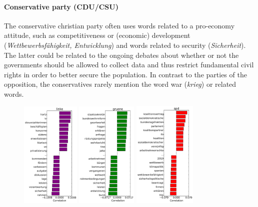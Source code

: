 \documentclass[runningheads,a4paper]{llncs}
\begin{document}
\paragraph{\bf Conservative party (CDU/CSU)}
The conservative christian party often uses words related to a pro-economy attitude, such as competitiveness or (economic) development ({\em Wettbewerbsf\"ahigkeit, Entwicklung}) and words related to security ({\em Sicherheit}). The latter could be related to the ongoing debates about whether or not the governments should be allowed to collect data and thus restrict fundamental civil rights in order to better secure the population. In contrast to the parties of the opposition, the conservatives rarely mention the word war ({\em krieg}) or related words.


\begin{figure}
\begin{center}
\includegraphics[width=2.8cm]{images/party_word_correlations-linke-18.pdf} 
\includegraphics[width=2.9cm]{images/party_word_correlations-gruene-18.pdf} 
\includegraphics[width=3cm]{images/party_word_correlations-spd-18.pdf} 

\end{center}
\end{figure}
\end{document}
